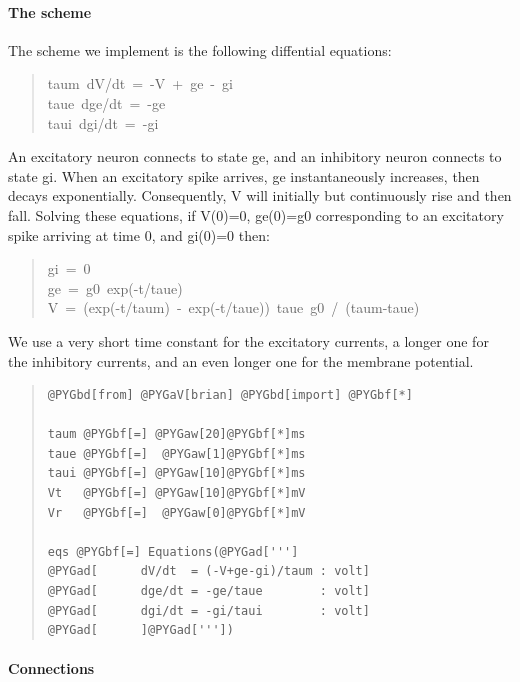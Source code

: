 \documentclass[letterpaper,10pt,english]{manual}
\begin{document}
\paragraph{The scheme}

The scheme we implement is the following diffential equations:
\begin{quote}
{\raggedright{}taum~dV/dt~=~-V~+~ge~-~gi\\
taue~dge/dt~=~-ge\\
taui~dgi/dt~=~-gi}
\end{quote}

An excitatory neuron connects to state ge, and an inhibitory neuron connects
to state gi. When an excitatory spike arrives, ge instantaneously increases,
then decays exponentially. Consequently, V will initially but continuously
rise and then fall. Solving these equations, if V(0)=0, ge(0)=g0 corresponding
to an excitatory spike arriving at time 0, and gi(0)=0 then:
\begin{quote}
{\raggedright{}gi~=~0\\
ge~=~g0~exp(-t/taue)\\
V~=~(exp(-t/taum)~-~exp(-t/taue))~taue~g0~/~(taum-taue)}
\end{quote}

We use a very short time constant for the excitatory currents, a longer one
for the inhibitory currents, and an even longer one for the membrane
potential.
\begin{quote}

\begin{Verbatim}[commandchars=@\[\]]
@PYGbd[from] @PYGaV[brian] @PYGbd[import] @PYGbf[*]

taum @PYGbf[=] @PYGaw[20]@PYGbf[*]ms
taue @PYGbf[=]  @PYGaw[1]@PYGbf[*]ms
taui @PYGbf[=] @PYGaw[10]@PYGbf[*]ms
Vt   @PYGbf[=] @PYGaw[10]@PYGbf[*]mV
Vr   @PYGbf[=]  @PYGaw[0]@PYGbf[*]mV

eqs @PYGbf[=] Equations(@PYGad[''']
@PYGad[      dV/dt  = (-V+ge-gi)/taum : volt]
@PYGad[      dge/dt = -ge/taue        : volt]
@PYGad[      dgi/dt = -gi/taui        : volt]
@PYGad[      ]@PYGad['''])
\end{Verbatim}
\end{quote}


\paragraph{Connections}
\end{document}
